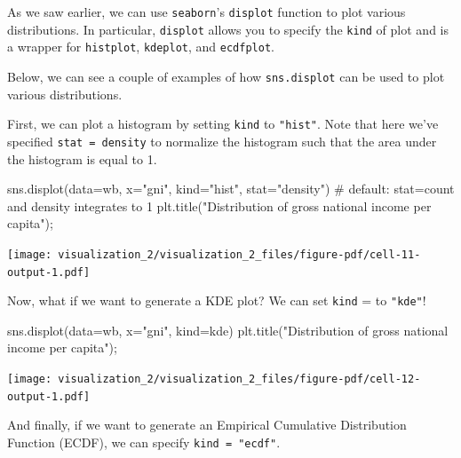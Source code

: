 \documentclass[
  letterpaper,
  DIV=11,
  numbers=noendperiod]{scrreprt}
\newenvironment{Shaded}{\begin{snugshade}}{\end{snugshade}}
\newcommand{\CommentTok}[1]{\textcolor[rgb]{0.37,0.37,0.37}{#1}}
\newcommand{\NormalTok}[1]{\textcolor[rgb]{0.00,0.23,0.31}{#1}}
\newcommand{\OperatorTok}[1]{\textcolor[rgb]{0.37,0.37,0.37}{#1}}
\newcommand{\StringTok}[1]{\textcolor[rgb]{0.13,0.47,0.30}{#1}}
\begin{document}
As we saw earlier, we can use \texttt{seaborn}'s \texttt{displot}
function to plot various distributions. In particular, \texttt{displot}
allows you to specify the \texttt{kind} of plot and is a wrapper for
\texttt{histplot}, \texttt{kdeplot}, and \texttt{ecdfplot}.

Below, we can see a couple of examples of how \texttt{sns.displot} can
be used to plot various distributions.

First, we can plot a histogram by setting \texttt{kind} to
\texttt{"hist"}. Note that here we've specified
\texttt{stat\ =\ density} to normalize the histogram such that the area
under the histogram is equal to 1.

\begin{Shaded}
\begin{Highlighting}[]
\NormalTok{sns.displot(data}\OperatorTok{=}\NormalTok{wb, }
\NormalTok{            x}\OperatorTok{=}\StringTok{"gni"}\NormalTok{, }
\NormalTok{            kind}\OperatorTok{=}\StringTok{"hist"}\NormalTok{, }
\NormalTok{            stat}\OperatorTok{=}\StringTok{"density"}\NormalTok{) }\CommentTok{\# default: stat=count and density integrates to 1}
\NormalTok{plt.title(}\StringTok{"Distribution of gross national income per capita"}\NormalTok{)}\OperatorTok{;}
\end{Highlighting}
\end{Shaded}

\texttt{[image: visualization\_2/visualization\_2\_files/figure-pdf/cell-11-output-1.pdf]}

Now, what if we want to generate a KDE plot? We can set \texttt{kind} =
to \texttt{"kde"}!

\begin{Shaded}
\begin{Highlighting}[]
\NormalTok{sns.displot(data}\OperatorTok{=}\NormalTok{wb, }
\NormalTok{            x}\OperatorTok{=}\StringTok{"gni"}\NormalTok{, }
\NormalTok{            kind}\OperatorTok{=}\StringTok{\textquotesingle{}kde\textquotesingle{}}\NormalTok{)}
\NormalTok{plt.title(}\StringTok{"Distribution of gross national income per capita"}\NormalTok{)}\OperatorTok{;}
\end{Highlighting}
\end{Shaded}

\texttt{[image: visualization\_2/visualization\_2\_files/figure-pdf/cell-12-output-1.pdf]}

And finally, if we want to generate an Empirical Cumulative Distribution
Function (ECDF), we can specify \texttt{kind\ =\ "ecdf"}.
\end{document}
